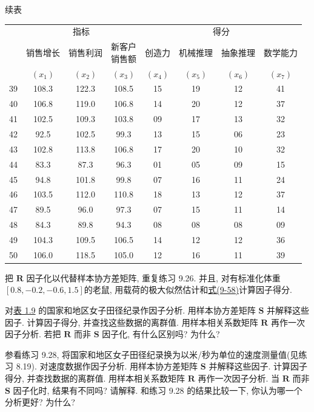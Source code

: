 
\begin{mvtable}
{\raggedleft\small 续表\par}
\small
\begin{tabular}{l|ccccccc}
\toprule
& \multicolumn{3}{c|}{指\quad 标} & \multicolumn{4}{c}{得\quad 分}\\
\cmidrule(lr){2-4}\cmidrule(l){5-8}
& 销售增长 & 销售利润 & \makecell{新客户\\销售额} & 创造力 & 机械推理 & 抽象推理 & 数学能力\\
& $(x_1)$ & $(x_2)$ & $(x_3)$ & $(x_4)$ & $(x_5)$ & $(x_6)$ & $(x_7)$\\
\midrule
39 & 108.3 & 122.3 & 108.5 & 15 & 19 & 12 & 41\\
40 & 106.8 & 119.0 & 106.8 & 14 & 20 & 12 & 37\\
41 & 102.5 & 109.3 & 103.8 & 09 & 17 & 13 & 32\\
42 & 92.5 & 102.5 & 99.3 & 13 & 15 & 06 & 23\\
43 & 102.8 & 113.8 & 106.8 & 17 & 20 & 10 & 32\\
44 & 83.3 & 87.3 & 96.3 & 01 & 05 & 09 & 15\\
45 & 94.8 & 101.8 & 99.8 & 07 & 16 & 11 & 24\\
46 & 103.5 & 112.0 & 110.8 & 18 & 13 & 12 & 37\\
47 & 89.5 & 96.0 & 97.3 & 07 & 15 & 11 & 14\\
48 & 84.3 & 89.8 & 94.3 & 08 & 08 & 08 & 09\\
49 & 104.3 & 109.5 & 106.5 & 14 & 12 & 12 & 36\\
50 & 106.0 & 118.5 & 105.0 & 12 & 16 & 11 & 39\\
\bottomrule
\end{tabular}
\end{mvtable}

\quad 把 $\mathbf{R}$ 因子化以代替样本协方差矩阵, 重复练习 9.26. 并且, 对有标准化体重$[0.8,-0.2,-0.6,1.5]$的老鼠, 用载荷的极大似然估计和\hyperref[eq:9-58]{式(9-58)}计算因子得分.

\quad 对\hyperref[tab:1.9]{表 1.9} 的国家和地区女子田径纪录作因子分析. 用样本协方差矩阵 $\mathbf{S}$ 并解释这些因子. 计算因子得分, 并查找这些数据的离群值. 用样本相关系数矩阵 $\mathbf{R}$ 再作一次因子分析. 若把 $\mathbf{R}$ 而非 $\mathbf{S}$ 因子化, 有什么区别吗? 为什么?

\quad 参看练习 9.28, 将国家和地区女子田径纪录换为以米/秒为单位的速度测量值(见练习 8.19). 对速度数据作因子分析. 用样本协方差矩阵 $\mathbf{S}$ 并解释这些因子. 计算因子得分, 并查找数据的离群值. 用样本相关系数矩阵 $\mathbf{R}$ 再作一次因子分析. 当 $\mathbf{R}$ 而非 $\mathbf{S}$ 因子化时, 结果有不同吗? 请解释. 和练习 9.28 的结果比较一下, 你认为哪一个分析更好? 为什么?

